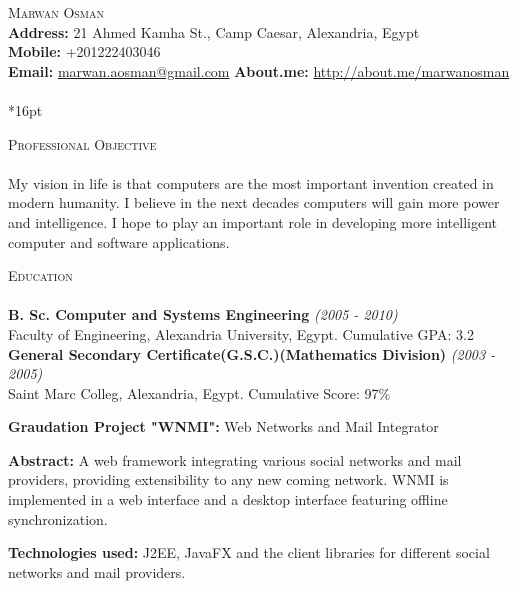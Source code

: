 \documentclass[letterpaper,12pt]{article}
\author{Marwan Osman}
\newcommand{\lineunder}{\vspace*{-8pt} \\ \hspace*{-8pt} \hrulefill \\}
\newcommand{\interval}[1] { \textit{(#1)} }
\newcommand{\header}[1]{{\hspace*{0pt}\vspace*{6pt} \textsc{#1}} \vspace*{-6pt} \lineunder}
\newcommand{\education}[3]{{\textbf{#1} \interval{#2}\\{#3}\\ }}
\newcommand{\objective}[1]{{#1\\\vspace*{8pt}}}
\newcommand{\contact}[3]{
\vspace*{-8pt}
{\LARGE \scshape {#1}}\\
#2 \lineunder 
#3
\vspace*{-8pt}
}
\newenvironment{details}{\vspace*{-4pt} \begin{list}{\topsep 0pt \itemsep -2pt}}{\vspace*{4pt}\end{list}}
\begin{document}
\small
\smallskip
\vspace*{-30pt}

\contact{Marwan Osman}
{\textbf{Address:} 21 Ahmed Kamha St., Camp Caesar, Alexandria, Egypt
\\\textbf{Mobile:} +201222403046
\\\textbf{Email:} \href{mailto:marwan.aosman@gmail.com}{marwan.aosman@gmail.com} \textbf{About.me:} \url{http://about.me/marwanosman}
}

\vspace*{16pt}

\header{Professional Objective}
\objective{ My vision in life is that computers are the most important invention created in modern humanity. I believe in the next decades computers will gain more power and intelligence. I hope to play an important role in developing more intelligent computer and software applications.}

\header{Education}
\education{B. Sc. Computer and Systems Engineering}{2005 - 2010}{Faculty of Engineering, Alexandria University, Egypt. Cumulative GPA: 3.2}
\vspace*{4pt}
\education{General Secondary Certificate(G.S.C.)(Mathematics Division)}{2003 - 2005}{Saint Marc Colleg, Alexandria, Egypt. Cumulative Score: 97\%}
  \begin{details}
    \item \textbf{ Graudation Project "WNMI":} Web Networks and Mail Integrator
    \item \textbf{ Abstract:} A web framework integrating various social networks and mail providers, providing extensibility to any new coming network. WNMI is implemented in a web interface and a desktop interface featuring offline synchronization.
    \item \textbf{ Technologies used:} J2EE, JavaFX and the client libraries for different social networks and mail providers.
  \end{details}
\vspace*{4pt}
\end{document}
